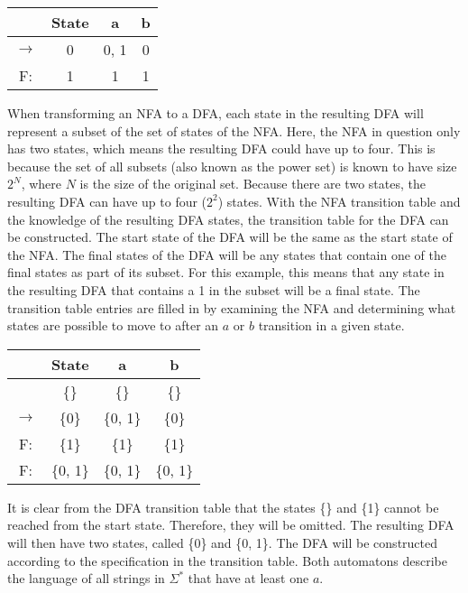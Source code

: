 \documentclass[12pt]{article}
\begin{document}
\begin{table}[h]
	\begin{center}
		\begin{tabular}{|c|c|c|c|}
			\toprule
			~ & State & a & b\\
			\midrule
			$\rightarrow$ & 0 & 0, 1 & 0\\
			F: & 1 & 1 & 1\\
			\bottomrule
		\end{tabular}
	\end{center}
\end{table}

When transforming an NFA to a DFA, each state in the resulting DFA will represent a subset of the set of states of the NFA. Here, the NFA in question only has two states, which means the resulting DFA could have up to four. This is because the set of all subsets (also known as the power set) is known to have size $2^N$, where $N$ is the size of the original set. Because there are two states, the resulting DFA can have up to four ($2^2$) states. With the NFA transition table and the knowledge of the resulting DFA states, the transition table for the DFA can be constructed. The start state of the DFA will be the same as the start state of the NFA. The final states of the DFA will be any states that contain one of the final states as part of its subset. For this example, this means that any state in the resulting DFA that contains a 1 in the subset will be a final state. The transition table entries are filled in by examining the NFA and determining what states are possible to move to after an $a$ or $b$ transition in a given state.

\begin{table}[h]
	\begin{center}
		\begin{tabular}{|c|c|c|c|}
			\toprule
			~ & State & a & b\\
			\midrule
			~ & \{\} & \{\} & \{\} \\
			$\rightarrow$ & \{0\} & \{0, 1\} & \{0\} \\
			F: & \{1\} & \{1\} & \{1\} \\
			F: & \{0, 1\} & \{0, 1\} & \{0, 1\} \\
			\bottomrule
		\end{tabular}
	\end{center}
\end{table}

It is clear from the DFA transition table that the states \{\} and \{1\} cannot be reached from the start state. Therefore, they will be omitted. The resulting DFA will then have two states, called \{0\} and \{0, 1\}. The DFA will be constructed according to the specification in the transition table. Both automatons describe the language of all strings in $\Sigma^*$ that have at least one $a$. 
\end{document}
